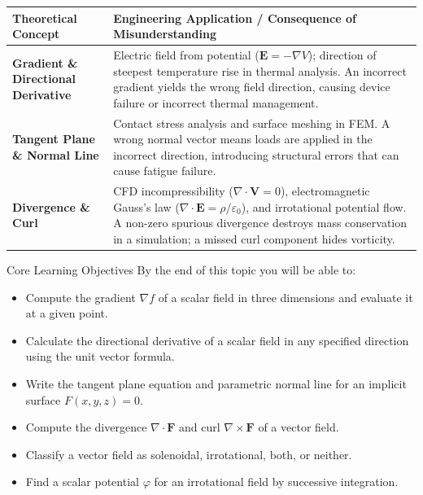 \documentclass[12pt,a4paper]{article}
\begin{document}
\begin{center}
\begin{tabular}{>{\bfseries}p{4.5cm} p{9.5cm}}
\toprule
Theoretical Concept & Engineering Application / Consequence of Misunderstanding \\
\midrule
Gradient \& Directional Derivative &
Electric field from potential ($\mathbf{E} = -\nabla V$); direction of steepest temperature rise in thermal analysis. An incorrect gradient yields the wrong field direction, causing device failure or incorrect thermal management. \\[6pt]
Tangent Plane \& Normal Line &
Contact stress analysis and surface meshing in FEM. A wrong normal vector means loads are applied in the incorrect direction, introducing structural errors that can cause fatigue failure. \\[6pt]
Divergence \& Curl &
CFD incompressibility ($\nabla \cdot \mathbf{V} = 0$), electromagnetic Gauss's law ($\nabla \cdot \mathbf{E} = \rho/\varepsilon_0$), and irrotational potential flow. A non-zero spurious divergence destroys mass conservation in a simulation; a missed curl component hides vorticity. \\
\bottomrule
\end{tabular}
\end{center}

\vspace{10pt}

\begin{learnbox}{Core Learning Objectives}
By the end of this topic you will be able to:
\begin{itemize}[leftmargin=*]
  \item Compute the gradient $\nabla f$ of a scalar field in three dimensions and evaluate it at a given point.
  \item Calculate the directional derivative of a scalar field in any specified direction using the unit vector formula.
  \item Write the tangent plane equation and parametric normal line for an implicit surface $F(x,y,z) = 0$.
  \item Compute the divergence $\nabla \cdot \mathbf{F}$ and curl $\nabla \times \mathbf{F}$ of a vector field.
  \item Classify a vector field as solenoidal, irrotational, both, or neither.
  \item Find a scalar potential $\varphi$ for an irrotational field by successive integration.
\end{itemize}
\end{learnbox}
\end{document}

